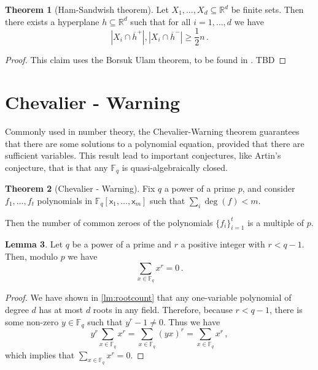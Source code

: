 \documentclass[12pt]{amsart}
\theoremstyle{definition}
\newtheorem{thm}{Theorem}[section]
\newtheorem{lm}[thm]{Lemma}
\newcommand{\R}{\mathbb{R}}
\newcommand{\F}{\mathbb{F}}
\newcommand{\vx}{\mathsf{x}}
\begin{document}
\begin{thm}[Ham-Sandwish theorem]
Let $X_1 ,  \ldots , X_d \subseteq  \R^d$ be finite sets.
Then there exists a hyperplane $h \subseteq \R^d$ such that for all $i=1, \ldots, d$ we have 
$$ |X_i \cap \overline{h}^+| , |X_i \cap \overline{h}^-| \geq \frac{1}{2} n\, . $$
\end{thm}

\begin{proof}
This claim uses the Borsuk Ulam theorem, to be found in \cite{matouvsek2003using}.
TBD

\end{proof}





\section{Chevalier - Warning}

Commonly used in number theory, the Chevalier-Warning theorem guarantees that there are some solutions to a polynomial equation, provided that there are sufficient variables.
This result lead to important conjectures, like Artin's conjecture, that is that any $\F_q$ is quasi-algebraically closed.

\begin{thm}[Chevalier - Warning]\label{thm:CW}
Fix $q$ a power of a prime $p$, and consider $f_1, \ldots, f_t$ polynomials in $\F_q[\vx_1, \ldots , \vx_m]$ such that $\sum_i \deg (f) < m$.

Then the number of common zeroes of the polynomials $\{ f_i\}_{i=1}^t $ is a multiple of $p$.
\end{thm}

\begin{lm}\label{lm:sum_infield}
Let $q$ be a power of a prime and $r$ a positive integer with $r < q - 1$. 
Then, modulo $p$ we have
$$ \sum_{x \in \F_q} x^r = 0 \, . $$
\end{lm}

\begin{proof}
We have shown in \cref{lm:rootcount} that any one-variable polynomial of degree $d$ has at most $d$ roots in any field.
Therefore, because $r < q-1$, there is some non-zero $y \in \F_q$ such that $y^r - 1 \neq 0$.
Thus we have 
$$y^r \sum_{x \in \F_q} x^r =  \sum_{x \in \F_q} (yx)^r =  \sum_{x \in \F_q} x^r \, , $$
which implies that $ \sum_{x \in \F_q} x^r = 0$.
\end{proof}
\end{document}

